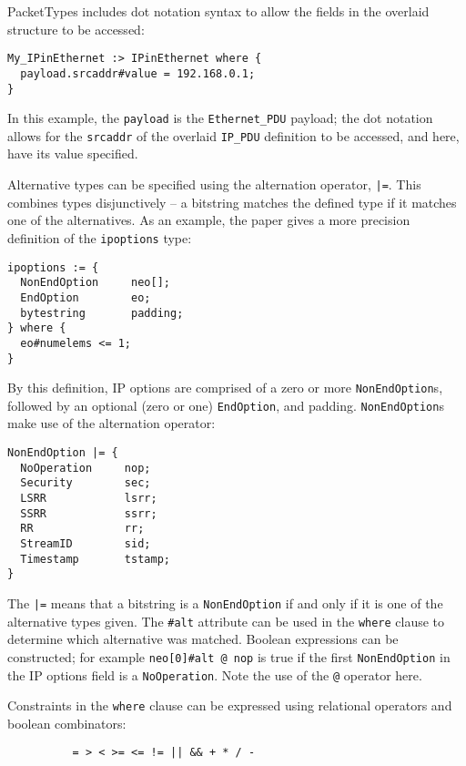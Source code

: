 \documentclass[10pt]{article}
\begin{document}
PacketTypes includes dot notation syntax to allow the fields in the overlaid structure to
be accessed:

\begin{verbatim}
My_IPinEthernet :> IPinEthernet where {
  payload.srcaddr#value = 192.168.0.1;
}
\end{verbatim}

In this example, the \texttt{payload} is the \texttt{Ethernet\_PDU} payload; the dot
notation allows for the \texttt{srcaddr} of the overlaid \texttt{IP\_PDU} definition to be
accessed, and here, have its value specified.

Alternative types can be specified using the alternation operator, \texttt{|=}. This
combines types disjunctively -- a bitstring matches the defined type if it matches one of
the alternatives. As an example, the paper gives a more precision definition of the
\texttt{ipoptions} type:

\begin{verbatim}
ipoptions := {
  NonEndOption     neo[];
  EndOption        eo;
  bytestring       padding;
} where {
  eo#numelems <= 1;
}
\end{verbatim}

By this definition, IP options are comprised of a zero or more \texttt{NonEndOption}s,
followed by an optional (zero or one) \texttt{EndOption}, and padding.
\texttt{NonEndOption}s make use of the alternation operator:

\begin{verbatim}
NonEndOption |= {
  NoOperation     nop;
  Security        sec;
  LSRR            lsrr;
  SSRR            ssrr;
  RR              rr;
  StreamID        sid;
  Timestamp       tstamp;
}
\end{verbatim}

The \texttt{|=} means that a bitstring is a \texttt{NonEndOption} if and only if it is one
of the alternative types given. The \texttt{\#alt} attribute can be used in the
\texttt{where} clause to determine which alternative was matched. Boolean expressions can
be constructed; for example \texttt{neo[0]\#alt @ nop} is true if the first
\texttt{NonEndOption} in the IP options field is a \texttt{NoOperation}. Note the use of
the \texttt{@} operator here.

Constraints in the \texttt{where} clause can be expressed using relational operators and
boolean combinators:
\begin{verbatim}
          = > < >= <= != || && + * / -
\end{verbatim}
\end{document}
